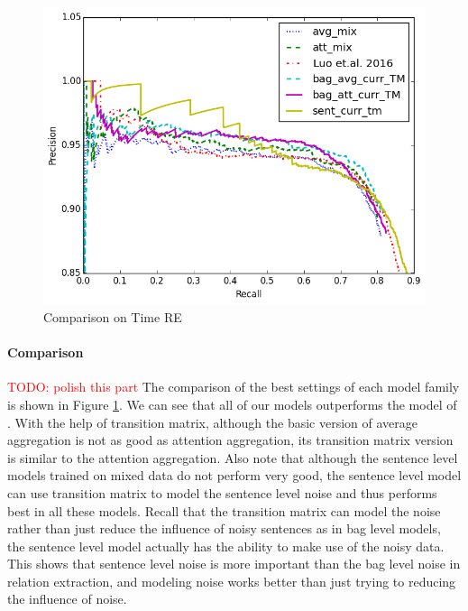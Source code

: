 \documentclass[11pt,a4paper]{article}
\newcommand{\todo}[1]{\textcolor{red}{TODO: #1}\PackageWarning{TODO:}{#1!}}
\begin{document}
\begin{figure}[htbp]
\begin{center}
\includegraphics[width=0.9\linewidth]{best_cmp_exp_overall.png}
\caption{Comparison on Time RE}
\label{fig: cmp_luo}
\end{center}
\end{figure}
 
\paragraph{Comparison}
\todo{polish this part} 
The comparison of the best settings of each model family is shown in Figure \ref{fig: cmp_luo}. We can see that all of our models outperforms the model of \cite{luo2016temporal}. With the help of transition matrix, although the basic version of average aggregation is not as good as attention aggregation, its transition matrix version is similar to the attention aggregation. Also note that although the sentence level models trained on mixed data do not perform very good, the sentence level model can use transition matrix to model the sentence level noise and thus performs best in all these models. Recall that the transition matrix can model the noise rather than just reduce the influence of noisy sentences as in bag level models, the sentence level model actually has the ability to make use of the noisy data. This shows that sentence level noise is more important than the bag level noise in relation extraction, and modeling noise works better than just trying to reducing the influence of noise.
\end{document}
